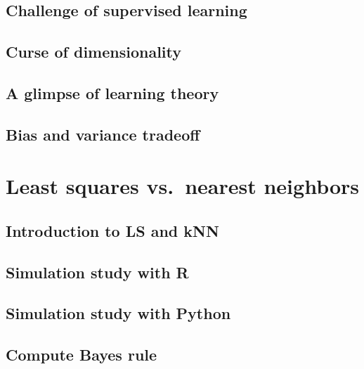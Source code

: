 \documentclass[
]{book}
\begin{document}
\hypertarget{challenge-of-supervised-learning}{%
\subsection{Challenge of supervised learning}\label{challenge-of-supervised-learning}}

\hypertarget{curse-of-dimensionality}{%
\subsection{Curse of dimensionality}\label{curse-of-dimensionality}}

\hypertarget{a-glimpse-of-learning-theory}{%
\subsection{A glimpse of learning theory}\label{a-glimpse-of-learning-theory}}

\hypertarget{bias-and-variance-tradeoff}{%
\subsection{Bias and variance tradeoff}\label{bias-and-variance-tradeoff}}

\hypertarget{least-squares-vs.-nearest-neighbors}{%
\section{Least squares vs.~nearest neighbors}\label{least-squares-vs.-nearest-neighbors}}

\hypertarget{introduction-to-ls-and-knn}{%
\subsection{Introduction to LS and kNN}\label{introduction-to-ls-and-knn}}

\hypertarget{simulation-study-with-r}{%
\subsection{Simulation study with R}\label{simulation-study-with-r}}

\hypertarget{simulation-study-with-python}{%
\subsection{Simulation study with Python}\label{simulation-study-with-python}}

\hypertarget{compute-bayes-rule}{%
\subsection{Compute Bayes rule}\label{compute-bayes-rule}}
\end{document}
